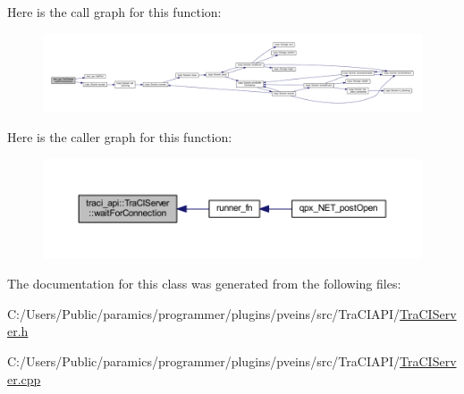 Here is the call graph for this function\+:\nopagebreak
\begin{figure}[H]
\begin{center}
\leavevmode
\includegraphics[width=350pt]{classtraci__api_1_1_tra_c_i_server_ac9cc474ec4ae6277c82cbf80f212852e_cgraph}
\end{center}
\end{figure}
Here is the caller graph for this function\+:\nopagebreak
\begin{figure}[H]
\begin{center}
\leavevmode
\includegraphics[width=350pt]{classtraci__api_1_1_tra_c_i_server_ac9cc474ec4ae6277c82cbf80f212852e_icgraph}
\end{center}
\end{figure}


The documentation for this class was generated from the following files\+:\begin{DoxyCompactItemize}
\item 
C\+:/\+Users/\+Public/paramics/programmer/plugins/pveins/src/\+Tra\+C\+I\+A\+P\+I/\hyperlink{_tra_c_i_server_8h}{Tra\+C\+I\+Server.\+h}\item 
C\+:/\+Users/\+Public/paramics/programmer/plugins/pveins/src/\+Tra\+C\+I\+A\+P\+I/\hyperlink{_tra_c_i_server_8cpp}{Tra\+C\+I\+Server.\+cpp}\end{DoxyCompactItemize}
